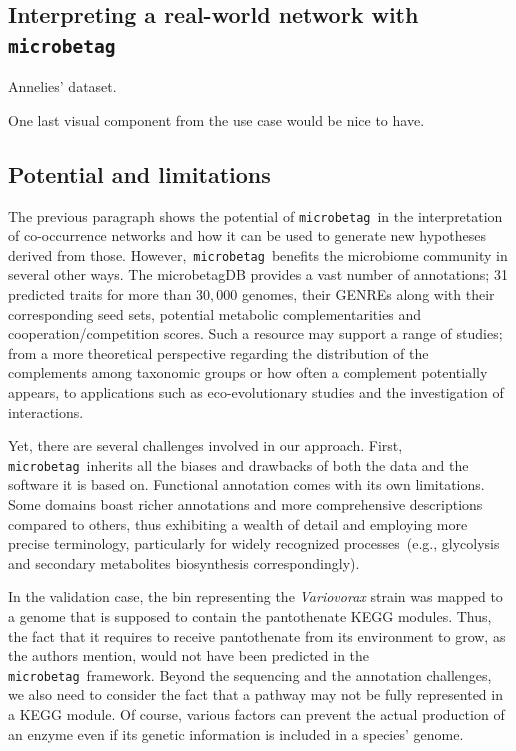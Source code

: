 \documentclass[sn-mathphys,Numbered]{sn-jnl}  %
\theoremstyle{thmstyleone}%
\theoremstyle{thmstyletwo}%
\theoremstyle{thmstylethree}%
\newcommand{\microbetag}{\texttt{microbetag}}
\begin{document}



    \subsection*{Interpreting a real-world network with \microbetag}
        \label{subsec:usecase}


        Annelies' dataset. 

        One last visual component from the use case would be nice to have.  





    \subsection*{Potential and limitations}
    \label{subsec:pot-and-limits}

        The previous paragraph shows the potential of \microbetag~in the interpretation of co-occurrence networks and how it can be used to generate new hypotheses derived from those.
        However,~\microbetag~benefits the microbiome community in several other ways. 
        The microbetagDB provides a vast number of annotations; 31 predicted traits for more than $30,000$ genomes, their GENREs along with their corresponding seed sets, potential metabolic complementarities and cooperation/competition scores.
        Such a resource may support a range of studies; 
        from a more theoretical perspective regarding the distribution of the complements among taxonomic groups or how often a complement potentially appears, to applications such as eco-evolutionary studies and the investigation of interactions.

        Yet, there are several challenges involved in our approach.
        First, \microbetag~inherits all the biases and drawbacks of both the data and the software it is based on.
        Functional annotation comes with its own limitations.
        Some domains boast richer annotations and more comprehensive descriptions compared to others, thus exhibiting a wealth of detail and employing more precise terminology, particularly for widely recognized processes~(e.g., glycolysis and secondary metabolites biosynthesis correspondingly).

        In the validation case, the bin representing the \textit{Variovorax} strain was mapped to a genome that is supposed to contain the pantothenate KEGG modules.
        Thus, the fact that it requires to receive pantothenate from its environment to grow, as the authors mention, would not have been predicted in the \microbetag~framework. 
        Beyond the sequencing and the annotation challenges, we also need to consider the fact that a pathway may not be fully represented in a KEGG module.
        Of course, various factors can prevent the actual production of an enzyme even if its genetic information is included in a species' genome.
        
\end{document}
